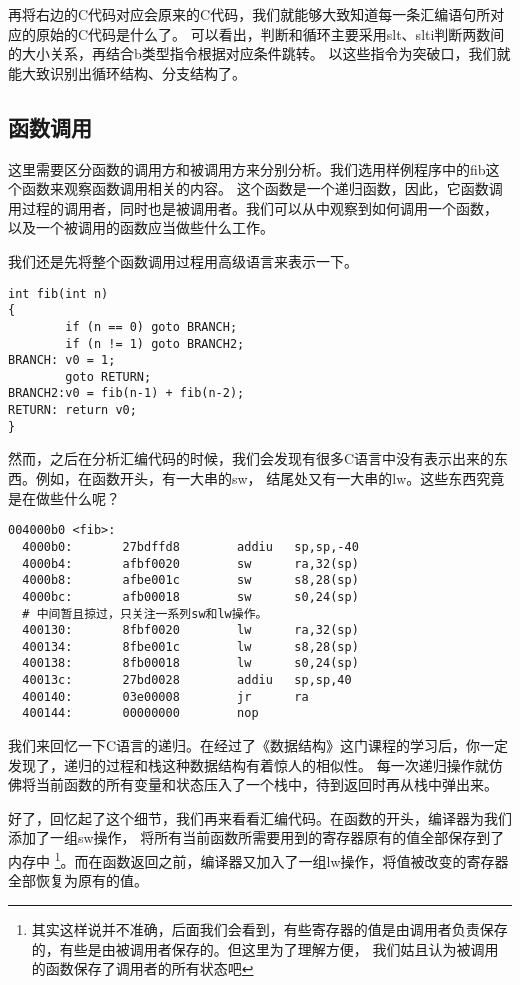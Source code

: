 再将右边的C代码对应会原来的C代码，我们就能够大致知道每一条汇编语句所对应的原始的C代码是什么了。
可以看出，判断和循环主要采用slt、slti判断两数间的大小关系，再结合b类型指令根据对应条件跳转。
以这些指令为突破口，我们就能大致识别出循环结构、分支结构了。

\subsection{函数调用}
这里需要区分函数的调用方和被调用方来分别分析。我们选用样例程序中的fib这个函数来观察函数调用相关的内容。
这个函数是一个递归函数，因此，它函数调用过程的调用者，同时也是被调用者。我们可以从中观察到如何调用一个函数，
以及一个被调用的函数应当做些什么工作。

我们还是先将整个函数调用过程用高级语言来表示一下。
\begin{verbatim}
int fib(int n)
{
        if (n == 0) goto BRANCH;
        if (n != 1) goto BRANCH2;
BRANCH: v0 = 1;
        goto RETURN;
BRANCH2:v0 = fib(n-1) + fib(n-2);
RETURN: return v0;
}
\end{verbatim}

然而，之后在分析汇编代码的时候，我们会发现有很多C语言中没有表示出来的东西。例如，在函数开头，有一大串的sw，
结尾处又有一大串的lw。这些东西究竟是在做些什么呢？

\begin{verbatim}
004000b0 <fib>:
  4000b0:       27bdffd8        addiu   sp,sp,-40
  4000b4:       afbf0020        sw      ra,32(sp)
  4000b8:       afbe001c        sw      s8,28(sp)
  4000bc:       afb00018        sw      s0,24(sp)
  # 中间暂且掠过，只关注一系列sw和lw操作。
  400130:       8fbf0020        lw      ra,32(sp)
  400134:       8fbe001c        lw      s8,28(sp)
  400138:       8fb00018        lw      s0,24(sp)
  40013c:       27bd0028        addiu   sp,sp,40
  400140:       03e00008        jr      ra
  400144:       00000000        nop
\end{verbatim}

我们来回忆一下C语言的递归。在经过了《数据结构》这门课程的学习后，你一定发现了，递归的过程和栈这种数据结构有着惊人的相似性。
每一次递归操作就仿佛将当前函数的所有变量和状态压入了一个栈中，待到返回时再从栈中弹出来。

好了，回忆起了这个细节，我们再来看看汇编代码。在函数的开头，编译器为我们添加了一组sw操作，
将所有当前函数所需要用到的寄存器原有的值全部保存到了内存中
\footnote{其实这样说并不准确，后面我们会看到，有些寄存器的值是由调用者负责保存的，有些是由被调用者保存的。但这里为了理解方便，
我们姑且认为被调用的函数保存了调用者的所有状态吧}。而在函数返回之前，编译器又加入了一组lw操作，将值被改变的寄存器全部恢复为原有的值。

